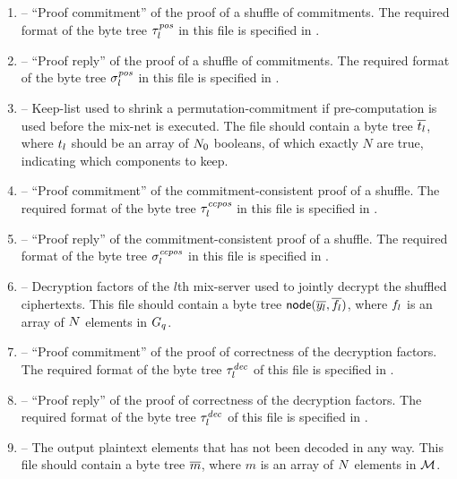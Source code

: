 \documentclass[11pt]{article}
\begin{document}
\begin{enumerate}
\item\label{poin:poscom} --
  ``Proof commitment'' of the proof of a shuffle of commitments. The
  required format of the byte tree $\tau_{l}^{\mathit{pos}}$ in this file is
  specified in .

\item\label{poin:posrep} -- ``Proof
  reply'' of the proof of a shuffle of commitments. The required
  format of the byte tree $\sigma_{l}^{\mathit{pos}}$ in this file is specified in
  .

\item\label{poin:keep} -- Keep-list
  used to shrink a permutation-commitment if pre-computation is used
  before the mix-net is executed. The file should contain a byte tree
  $\overline{t_{l}}$, where $t_{l}$ should be an array of
  $N_{0}$ booleans, of which exactly $N$ are true, indicating which
  components to keep.

\item\label{poin:ccposcom} --
  ``Proof commitment'' of the commitment-consistent proof of a
  shuffle. The required format of the byte tree $\tau_{l}^{\mathit{ccpos}}$ in
  this file is specified in .

\item\label{poin:ccposrep} -- ``Proof
  reply'' of the commitment-consistent proof of a shuffle. The
  required format of the byte tree $\sigma_{l}^{\mathit{ccpos}}$ in this file is
  specified in .

\item\label{poin:decr} --
  Decryption factors of the $l$th mix-server used to jointly decrypt
  the shuffled ciphertexts. This file should contain a byte tree
  $\textsf{node}(\overline{y_{l}},\overline{f_{l}})$, where $f_{l}$ is an
  array of $N$ elements in $G_{q}$.

\item\label{poin:decrcom} --
  ``Proof commitment'' of the proof of correctness of the decryption
  factors. The required format of the byte tree $\tau_{l}^{\mathit{dec}}$ of this
  file is specified in .

\item\label{poin:decrrep} --
  ``Proof reply'' of the proof of correctness of the decryption
  factors. The required format of the byte tree $\tau_{l}^{\mathit{dec}}$ of this
  file is specified in .

\item\label{poin:plain} -- The output
  plaintext elements that has not been decoded in any way. This file
  should contain a byte tree $\overline{m}$, where $m$ is an array of $N$
  elements in $\mathcal{M}$.

\end{enumerate}
\end{document}
